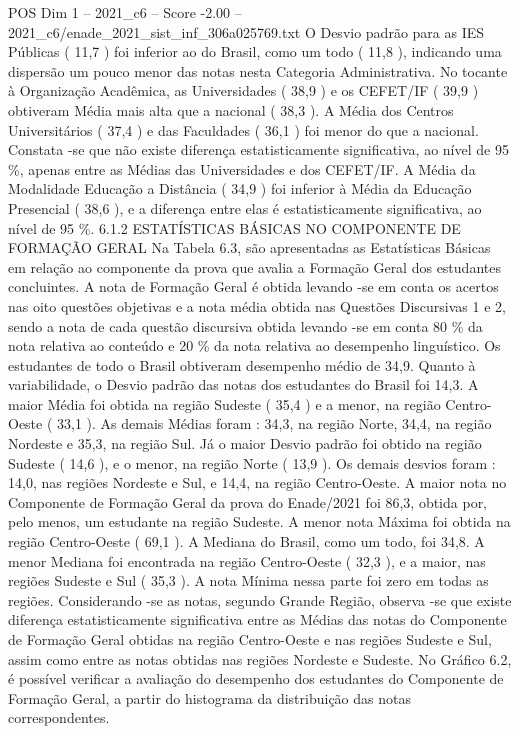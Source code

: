 \begin{textsample}{POS Dim 1 – 2021\_c6 – Score -2.00 – 2021\_c6/enade\_2021\_sist\_inf\_306a025769.txt}
O Desvio padrão para as IES Públicas ( 11,7 ) foi inferior ao do Brasil, como um todo ( 11,8 ), indicando uma dispersão um pouco menor das notas nesta Categoria Administrativa.
No tocante à Organização Acadêmica, as Universidades ( 38,9 ) e os CEFET/IF ( 39,9 ) obtiveram Média mais alta que a nacional ( 38,3 ).
A Média dos Centros Universitários ( 37,4 ) e das Faculdades ( 36,1 ) foi menor do que a nacional.
Constata -se que não existe diferença estatisticamente significativa, ao nível de 95 \%, apenas entre as Médias das Universidades e dos CEFET/IF.
A Média da Modalidade Educação a Distância ( 34,9 ) foi inferior à Média da Educação Presencial ( 38,6 ), e a diferença entre elas é estatisticamente significativa, ao nível de 95 \%. 6.1.2 ESTATÍSTICAS BÁSICAS NO COMPONENTE DE FORMAÇÃO GERAL Na Tabela 6.3, são apresentadas as Estatísticas Básicas em relação ao componente da prova que avalia a Formação Geral dos estudantes concluintes.
A nota de Formação Geral é obtida levando -se em conta os acertos nas oito questões objetivas e a nota média obtida nas Questões Discursivas 1 e 2, sendo a nota de cada questão discursiva obtida levando -se em conta 80 \% da nota relativa ao conteúdo e 20 \% da nota relativa ao desempenho linguístico.
Os estudantes de todo o Brasil obtiveram desempenho médio de 34,9.
Quanto à variabilidade, o Desvio padrão das notas dos estudantes do Brasil foi 14,3.
A maior Média foi obtida na região Sudeste ( 35,4 ) e a menor, na região Centro-Oeste ( 33,1 ).
As demais Médias foram : 34,3, na região Norte, 34,4, na região Nordeste e 35,3, na região Sul.
Já o maior Desvio padrão foi obtido na região Sudeste ( 14,6 ), e o menor, na região Norte ( 13,9 ).
Os demais desvios foram : 14,0, nas regiões Nordeste e Sul, e 14,4, na região Centro-Oeste.
A maior nota no Componente de Formação Geral da prova do Enade/2021 foi 86,3, obtida por, pelo menos, um estudante na região Sudeste.
A menor nota Máxima foi obtida na região Centro-Oeste ( 69,1 ).
A Mediana do Brasil, como um todo, foi 34,8.
A menor Mediana foi encontrada na região Centro-Oeste ( 32,3 ), e a maior, nas regiões Sudeste e Sul ( 35,3 ).
A nota Mínima nessa parte foi zero em todas as regiões.
Considerando -se as notas, segundo Grande Região, observa -se que existe diferença estatisticamente significativa entre as Médias das notas do Componente de Formação Geral obtidas na região Centro-Oeste e nas regiões Sudeste e Sul, assim como entre as notas obtidas nas regiões Nordeste e Sudeste.
No Gráfico 6.2, é possível verificar a avaliação do desempenho dos estudantes do Componente de Formação Geral, a partir do histograma da distribuição das notas correspondentes.

\end{textsample}
